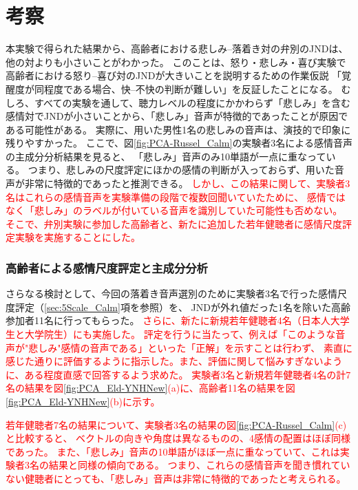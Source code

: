 \section{考察}
本実験で得られた結果から、高齢者における悲しみ--落着き対の弁別のJNDは、他の対よりも小さいことがわかった。
このことは、怒り・悲しみ・喜び実験で高齢者における怒り--喜び対のJNDが大きいことを説明するための作業仮説
「覚醒度が同程度である場合、快--不快の判断が難しい」を反証したことになる。
むしろ、すべての実験を通して、聴力レベルの程度にかかわらず「悲しみ」を含む感情対でJNDが小さいことから、「悲しみ」音声が特徴的であったことが原因である可能性がある。
実際に、用いた男性1名の悲しみの音声は、演技的で印象に残りやすかった。
ここで、図\ref{fig:PCA-Russel_Calm}の実験者3名による感情音声の主成分分析結果を見ると、
「悲しみ」音声のみ10単語が一点に重なっている。
つまり、悲しみの尺度評定にほかの感情の判断が入っておらず、用いた音声が非常に特徴的であったと推測できる。
\textcolor{red}{しかし、この結果に関して、実験者3名はこれらの感情音声を実験準備の段階で複数回聞いていたために、
感情ではなく「悲しみ」のラベルが付いている音声を識別していた可能性も否めない。
そこで、弁別実験に参加した高齢者と、新たに追加した若年健聴者に感情尺度評定実験を実施することにした。}


\subsubsection{高齢者による感情尺度評定と主成分分析}
さらなる検討として、今回の落着き音声選別のために実験者3名で行った感情尺度評定（\ref{sec:5Scale_Calm}項を参照）を、
JNDが外れ値だった1名を除いた高齢参加者11名に行ってもらった。
\textcolor{red}{
  さらに、新たに新規若年健聴者4名（日本人大学生と大学院生）にも実施した。
  評定を行うに当たって、例えば「このような音声が"悲しみ"感情の音声である」といった「正解」を示すことは行わず、
  素直に感じた通りに評価するように指示した。また、評価に関して悩みすぎないように、ある程度直感で回答するよう求めた。
  実験者3名と新規若年健聴者4名の計7名の結果を図\ref{fig:PCA_Eld-YNHNew}(a)に、高齢者11名の結果を図\ref{fig:PCA_Eld-YNHNew}(b)に示す。
}

\textcolor{red}{
  若年健聴者7名の結果について、実験者3名の結果の図\ref{fig:PCA-Russel_Calm}(c)と比較すると、
  ベクトルの向きや角度は異なるものの、4感情の配置はほぼ同様であった。
  また、「悲しみ」音声の10単語がほぼ一点に重なっていて、これは実験者3名の結果と同様の傾向である。
  つまり、これらの感情音声を聞き慣れていない健聴者にとっても、「悲しみ」音声は非常に特徴的であったと考えられる。
}

